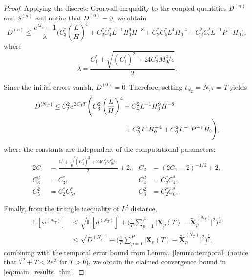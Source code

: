 \documentclass[review,onefignum,onetabnum]{siamart250211}
\begin{document}
\begin{proof}
Applying the discrete Gronwall inequality to the coupled quantities
\(D^{(n)}\) and \(S^{(n)}\) and notice that $D^{(0)}=0$, we obtain
\begin{equation}
\label{eq:D_gronwall}
D^{(n)}
\leq
\frac{e^{\lambda t_n}-1}{\lambda}
\Bigg(
C_3^*\left(\frac{L}{H}\right)^4
+C_2^*C_4^*L^{-1}H_0^9H^{-8}
+C_2^*C_5^*L^4H_0^{-4}
+C_2^*C_6^*L^{-1}P^{-1}H_0
\Bigg),
\end{equation}
where
\[
\lambda
=
\frac{
C_1^*
+\sqrt{(C_1^*)^2+24C_2^*M_0^2/\epsilon}
}{2}.
\]

Since the initial errors vanish, \(D^{(0)}=0\). Therefore, setting
\(t_{N_T}=N_T\tau=T\) yields
\begin{equation}
\label{eq:D_final}
\begin{aligned}
D^{(N_T)}
\leq{}&
C_2^2 e^{2C_1T}
\Bigg(
C_3^2\left(\frac{L}{H}\right)^4
+C_4^2L^{-1}H_0^9H^{-8} \\
&\hspace{3.2cm}
+C_5^2L^4H_0^{-4}
+C_6^2L^{-1}P^{-1}H_0
\Bigg),
\end{aligned}
\end{equation}
where the constants are independent of the computational parameters:
\begin{equation}
\begin{aligned}
2C_1
&=
\frac{
C_1^*
+\sqrt{(C_1^*)^2+24C_2^*M_0^2/\epsilon}
}{2}+2,
&
C_2&=(2C_1-2)^{-1/2}+2,\\
C_3^2&=C_3^*,
&
C_4^2&=C_2^*C_4^*,\\
C_5^2&=C_2^*C_5^*,
&
C_6^2&=C_2^*C_6^*.
\end{aligned}
\end{equation}

Finally, from the triangle inequality of \(L^2\) distance,
\begin{equation}\label{eq:convergence_estimate}
\begin{aligned}
\mathbb{E}[w^{(N_T)}]
    &\leq \sqrt{\mathbb{E}[d^{(N_T)}]} + 
    \Biggl( \frac{1}{P} \sum_{p=1}^{P} \bigl| \mathbf{X}_p(T) - \widetilde{\mathbf{X}}_p^{(N_T)} \bigr|^2 \Biggr)^{\!\frac{1}{2}}\\  &\leq \sqrt{D^{(N_T)}} + 
    \Biggl( \frac{1}{P} \sum_{p=1}^{P} \bigl| \mathbf{X}_p(T) - \widetilde{\mathbf{X}}_p^{(N_T)} \bigr|^2 \Biggr)^{\!\frac{1}{2}},    
\end{aligned}
\end{equation}
combining with the temporal error bound from Lemma~\ref{lemma:temporal} (notice that $T^2+T <2e^T$ for $T>0$), we obtain the claimed convergence bound in  \eqref{eq:main_results_thm}.
\end{proof}
\end{document}
